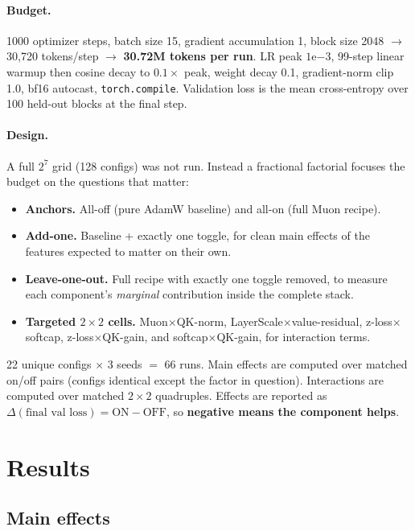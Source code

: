 \documentclass[11pt]{article}
\begin{document}
\paragraph{Budget.} 1000 optimizer steps, batch size 15, gradient accumulation
1, block size 2048 $\to$ 30{,}720 tokens/step $\to$ \textbf{30.72M tokens per
run}. LR peak $1\mathrm{e}{-3}$, 99-step linear warmup then cosine decay to
$0.1\times$ peak, weight decay 0.1, gradient-norm clip 1.0, bf16 autocast,
\texttt{torch.compile}. Validation loss is the mean cross-entropy over 100
held-out blocks at the final step.

\paragraph{Design.} A full $2^7$ grid (128 configs) was not run. Instead a
fractional factorial focuses the budget on the questions that matter:
\begin{itemize}
  \item \textbf{Anchors.} All-off (pure AdamW baseline) and all-on (full Muon recipe).
  \item \textbf{Add-one.} Baseline + exactly one toggle, for clean main effects of the features expected to matter on their own.
  \item \textbf{Leave-one-out.} Full recipe with exactly one toggle removed, to measure each component's \emph{marginal} contribution inside the complete stack.
  \item \textbf{Targeted $2\times2$ cells.} Muon$\times$QK-norm, LayerScale$\times$value-residual, z-loss$\times$softcap, z-loss$\times$QK-gain, and softcap$\times$QK-gain, for interaction terms.
\end{itemize}
22 unique configs $\times$ 3 seeds $=$ 66 runs. Main effects are computed over
matched on/off pairs (configs identical except the factor in question).
Interactions are computed over matched $2\times2$ quadruples. Effects are
reported as $\Delta(\text{final val loss}) = \text{ON} - \text{OFF}$, so
\textbf{negative means the component helps}.

\section{Results}

\subsection{Main effects}
\end{document}
